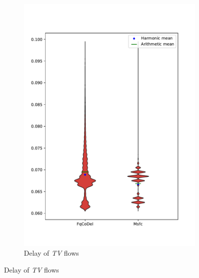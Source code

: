 \begin{figure}
\begin{subfigure}[b]{0.475\textwidth}
		\includegraphics[width=\textwidth]{drawings/type3-delay-down_A}
		\caption[]%
		{{\small Delay of \emph{TV} flows}}    
		\label{fig:delay_tv}
	\end{subfigure}


\end{figure}

